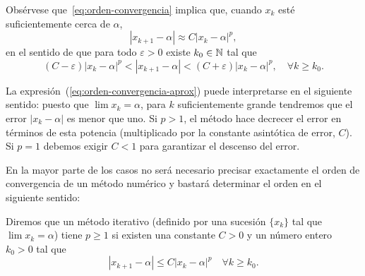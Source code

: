 Obsérvese que~\eqref{eq:orden-convergencia} implica que, cuando $x_k$
esté suficientemente cerca de $\alpha$,
\begin{equation}
  \label{eq:orden-convergencia-aprox}
   |x_{k+1}-\alpha| \approx C |x_{k}-\alpha|^p,
\end{equation}
en el sentido de que para todo $\varepsilon>0$ existe $k_0\in\operatorname{{\mathbb N}}$ tal que
\begin{equation*}
   \label{eq:orden-convergencia-2}
  (C-\varepsilon) |x_{k}-\alpha|^p < |x_{k+1}-\alpha| < 
  (C+\varepsilon)  |x_{k}-\alpha|^p, \quad \forall k \ge k_0.
\end{equation*}

\begin{remark}
\label{rk:interpretacion-orden-convergencia}
  La expresión~(\ref{eq:orden-convergencia-aprox}) puede interpretarse
  en el siguiente sentido: puesto que $\lim x_k=\alpha$, para $k$
  suficientemente grande tendremos que el error $|x_k-\alpha|$ es
  menor que uno. Si $p>1$, el método hace decrecer el error en
  términos de esta potencia (multiplicado por la constante asintótica
  de error, $C$). Si $p=1$ debemos exigir
  $C<1$ para garantizar el descenso del error.\label{rk:1}
\end{remark}
En la mayor parte de los casos no será necesario precisar exactamente
el orden de convergencia de un método numérico y bastará determinar el
orden en el siguiente sentido:

\begin{definition}
  Diremos que un método iterativo (definido por una sucesión $\{x_k\}$ tal
  que $\lim x_k=\alpha$) tiene 
  $p\ge 1$ si existen una constante $C>0$ y un número entero $k_0>0$
  tal que
  \begin{equation}
    \label{eq:orden-convergencia-al-menos-p}
    |x_{k+1}-\alpha| \le C |x_k-\alpha|^p \quad \forall k\ge k_0.
  \end{equation}
\end{definition}


